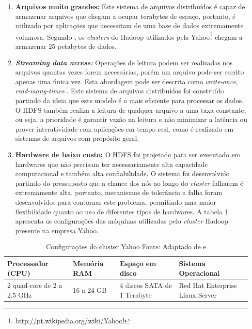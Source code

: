 \begin{enumerate}

\item \textbf{Arquivos muito grandes:} Este sistema de arquivos distribuídos é capaz de armazenar arquivos que chegam a ocupar terabytes de espaço, portanto, é utilizado por aplicações que necessitam de uma base de dados extremamente volumosa. Segundo , os \textit{clusters} do Hadoop utilizados pela Yahoo\footnote{\url{http://pt.wikipedia.org/wiki/Yahoo!}} chegam a armazenar 25 petabytes de dados.

\item \textit{\textbf{Streaming data access:}} Operações de leitura podem ser realizadas nos arquivos quantas vezes forem necessárias, porém um arquivo pode ser escrito apenas uma única vez. Esta abordagem pode ser descrita como \textit{write-once}, \textit{read-many-times} \cite{white2012}. Este sistema de arquivos distribuídos foi construído partindo da ideia que este modelo é o mais eficiente para processar os dados. O HDFS também realiza a leitura de qualquer arquivo a uma taxa constante, ou seja, a prioridade é garantir vazão na leitura e não minimizar a latência ou prover interatividade com aplicações em tempo real, como é realizado em sistemas de arquivos com propósito geral.

\item \textbf{Hardware de baixo custo:} O HDFS foi projetado para ser executado em hardwares que não precisam ter necessariamente alta capacidade computacional e também alta confiabilidade. O sistema foi desenvolvido partindo do pressuposto que a chance dos nós ao longo do \textit{cluster} falharem é extremamente alta, portanto, mecanismos de tolerância a falha foram desenvolvidos para contornar este problema, permitindo uma maior flexibilidade quanto ao uso de diferentes tipos de hardwares. A tabela \ref{tab-hardware} apresenta as configurações das máquinas utilizadas pelo \textit{cluster} Hadoop presente na empresa Yahoo.

\end{enumerate}

\begin{table}[!ht]
\begin{center}
  \begin{tabular}{|p{3cm}|p{2cm}|p{3cm}|p{4cm}|}
	\hline
	Processador (CPU) & Memória RAM  & Espaço em disco & Sistema Operacional
	\\ \hline
	2 quad-core de 2 a 2,5 GHz & 16 a 24 GB & 4 discos SATA de 1 Terabyte & Red Hat Enterprise Linux Server
	\\ \hline
  \end{tabular}
  \captionsetup{justification=centering}
  \caption[Configurações do cluster Yahoo]{Configurações do cluster Yahoo
  \protect\linebreak Fonte: Adaptado de \cite{white2012} e \cite{shvachko2010}}
\label{tab-hardware}
\end{center}
\end{table}
\FloatBarrier

